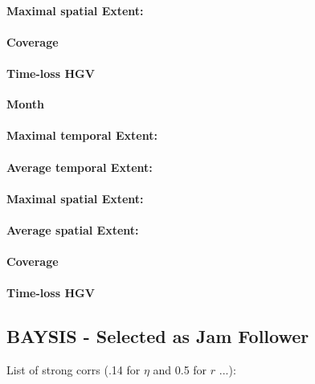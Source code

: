 \begin{table}[ht]
\paragraph{Maximal spatial Extent:}
\paragraph{Coverage}
\paragraph{Time-loss HGV}

\large
\centerline{\textbf{Month}}
\normalsize

\paragraph{Maximal temporal Extent:}
\paragraph{Average temporal Extent:}
\paragraph{Maximal spatial Extent:}
\paragraph{Average spatial Extent:}
\paragraph{Coverage}
\paragraph{Time-loss HGV}

\subsection{BAYSIS - Selected as Jam Follower}

List of strong corrs (.14 for $\eta$ and 0.5 for $r$ ...):


\end{table}
